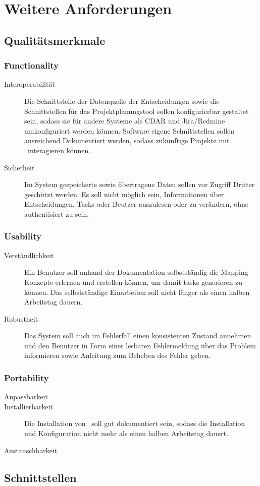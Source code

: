 \section{Weitere Anforderungen}

	\subsection{Qualitätsmerkmale}


		\subsubsection{Functionality}
		\begin{description}
			\item[Interoperabilität] Die Schnittstelle der Datenquelle der Entscheidungen sowie die Schnittstellen für das Projektplanungstool sollen konfigurierbar gestaltet sein, sodass sie für andere Systeme als CDAR und Jira/Redmine umkonfiguriert werden können. 
			Software eigene Schnittstellen sollen ausreichend Dokumentiert werden, sodass zukünftige Projekte mit \eeppi\ interagieren können.
			\item[Sicherheit] Im System gespeicherte sowie übertragene Daten sollen vor Zugriff Dritter geschützt werden.
			Es soll nicht möglich sein, Informationen über Entscheidungen, Tasks oder Beutzer auszulesen oder zu verändern, 
			ohne authentisiert zu sein.
		\end{description}

		\subsubsection{Usability}
		\begin{description}
			\item[Verständlichkeit] Ein Benutzer soll anhand der Dokumentation selbstständig die Mapping Konzepte erlernen und erstellen können, um damit tasks generieren zu können. Das selbstständige Einarbeiten soll nicht länger als einen halben Arbeitstag dauern.
			\item[Robustheit] Das System soll auch im Fehlerfall einen konsistenten Zustand annehmen und den Benutzer in Form einer lesbaren Fehlermeldung über das Problem informieren sowie Anleitung zum Beheben des Fehler geben.
		\end{description}

		\subsubsection{Portability}
		\begin{description}
			\item[Anpassbarkeit] 
			\item[Installierbarkeit] Die Installation von \eeppi\ soll gut dokumentiert sein, sodass die Installation und Konfiguration nicht mehr als einen halben Arbeitstag dauert.
			\item[Austauschbarkeit]
		\end{description}

	\subsection{Schnittstellen}